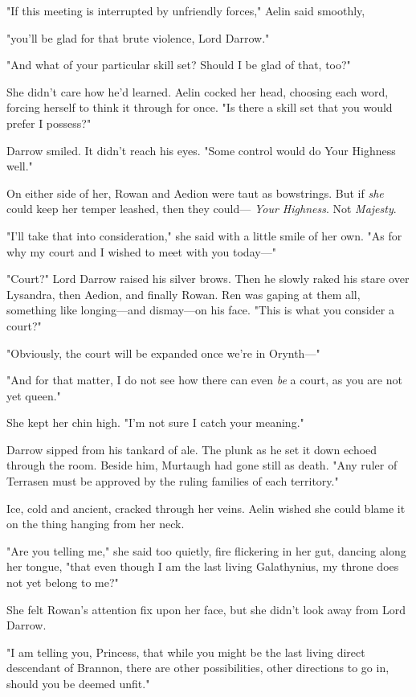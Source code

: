 "If this meeting is interrupted by unfriendly forces," Aelin said smoothly,

"you'll be glad for that brute violence, Lord Darrow."

"And what of your particular skill set?
Should I be glad of that, too?"

She didn't care how he'd learned. 
Aelin cocked her head, choosing each word, forcing herself to think it through for once. 
"Is there a skill set that you would prefer I possess?"

Darrow smiled. 
It didn't reach his eyes. 
"Some control would do Your Highness well."

On either side of her, Rowan and Aedion were taut as bowstrings. 
But if \emph{she} could keep her temper leashed, then they could--- \emph{Your Highness}. 
Not \emph{Majesty}.

"I'll take that into consideration," she said with a little smile of her own. 
"As for why my court and I wished to meet with you today---"

"Court?" 
Lord Darrow raised his silver brows. 
Then he slowly raked his stare over Lysandra, then Aedion, and finally Rowan. 
Ren was gaping at them all, something like longing---and dismay---on his face. 
"This is what you consider a court?"

"Obviously, the court will be expanded once we're in Orynth---"

"And for that matter, I do not see how there can even \emph{be} a court, as you are not yet queen."

She kept her chin high. 
"I'm not sure I catch your meaning."

Darrow sipped from his tankard of ale. 
The plunk as he set it down echoed through the room. 
Beside him, Murtaugh had gone still as death. 
"Any ruler of Terrasen must be approved by the ruling families of each territory."

Ice, cold and ancient, cracked through her veins. 
Aelin wished she could blame it on the thing hanging from her neck.

"Are you telling me," she said too quietly, fire flickering in her gut, dancing along her tongue, "that even though I am the last living Galathynius, my throne does not yet belong to me?"

She felt Rowan's attention fix upon her face, but she didn't look away from Lord Darrow.

"I am telling you, Princess, that while you might be the last living direct descendant of Brannon, there are other possibilities, other directions to go in, should you be deemed unfit."

